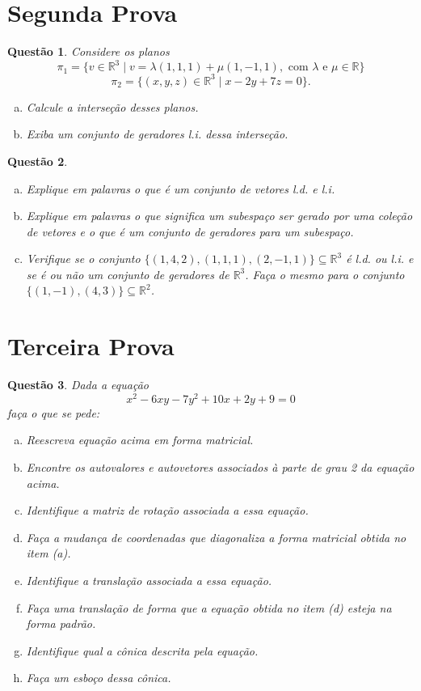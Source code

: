 \documentclass[a4paper,12pt]{article}
\def\R{\mathbb R}
\newtheorem{qst}{Questão}
\begin{document}
\section*{Segunda Prova}
\setcounter{qst}{0}
\begin{qst}
	Considere os planos $$\pi_1=\{v\in \R^3\mid v=\lambda(1,1,1)+\mu(1,-1,1),\mbox{ com }\lambda\mbox{ e }\mu\in \R\}$$ $$\pi_2=\{(x,y,z)\in\R^3\mid x-2y+7z=0\}.$$
	\begin{enumerate}[a)]
		\item Calcule a interseção desses planos.
		\item Exiba um conjunto de geradores l.i. dessa interseção.
	\end{enumerate}
\end{qst}

\begin{qst}
	\begin{enumerate}[a)]
		\item Explique em palavras o que é um conjunto de vetores l.d. e l.i.
		\item Explique em palavras o que significa um subespaço ser gerado por uma coleção de vetores e o que é um conjunto de geradores para um subespaço.
		\item Verifique se o conjunto $\{(1,4,2), (1,1,1), (2,-1,1)\}\subseteq\R^3$ é l.d. ou l.i. e se é ou não um conjunto de geradores de $\R^3$. Faça o mesmo para o conjunto $\{(1,-1),(4,3)\}\subseteq\R^2$.
	\end{enumerate}
\end{qst}

\section*{Terceira Prova}
\setcounter{qst}{0}
\begin{qst}	
	Dada a equação \[x^2-6xy-7y^2+10x+2y+9=0\]faça o que se pede:
	\begin{enumerate}[a)]
		\item Reescreva equação acima em forma matricial.
		\item Encontre os autovalores e autovetores associados à parte de grau 2 da equação acima.
		\item Identifique a matriz de rotação associada a essa equação.
		\item Faça a mudança de coordenadas que diagonaliza a forma matricial obtida no item (a).
		\item Identifique a translação associada a essa equação.
		\item Faça uma translação de forma que a equação obtida no item (d) esteja na forma padrão.
		\item Identifique qual a cônica descrita pela equação.
		\item Faça um esboço dessa cônica.
	\end{enumerate}
\end{qst}
\end{document}
